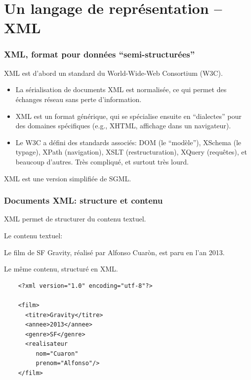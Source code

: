 \section{Un langage de représentation -- XML}

\begin{frame}
\frametitle{XML, format pour données ``semi-structurées''}

XML est d'abord un standard du World-Wide-Web Consortium (W3C).

\begin{itemize}
  \item La sérialisation de documents XML est normalisée, ce qui permet
       des échanges réseau sans perte d'information.
 
  \item XML est un format générique, qui se spécialise ensuite en
     \alert{``dialectes''} pour des domaines spécifiques (e.g., XHTML,
     affichage dans un navigateur).

  \item Le W3C a défini des standards associés: DOM (le ``modèle''), 
   XSchema (le typage), XPath (navigation), XSLT (restructuration),
     XQuery (requêtes), et beaucoup d'autres. Très compliqué, et surtout
     très lourd.
\end{itemize}

\begin{remark}
XML est une version simplifiée de \alert{SGML}.
\end{remark}

\end{frame}



\begin{frame}[fragile]
\frametitle{Documents XML: structure et contenu}

XML permet de \alert{structurer} du contenu textuel.

\vfill

Le contenu textuel:

\begin{center}
  Le film de SF Gravity,  
  réalisé par Alfonso Cuaròn, est paru en l'an 2013.
\end{center}

\vfill

Le même contenu, structuré en XML.

\begin{lstlisting}
    <?xml version="1.0" encoding="utf-8"?>

    <film>
      <titre>Gravity</titre>
      <annee>2013</annee>
      <genre>SF</genre>
      <realisateur
         nom="Cuaron"
         prenom="Alfonso"/>
    </film>
\end{lstlisting}

\end{frame}


